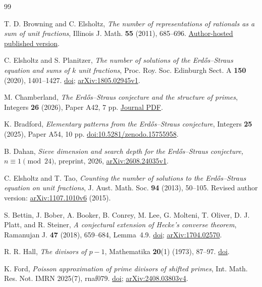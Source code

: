 \documentclass[11pt]{article}
\theoremstyle{remark}\newtheorem{remark}[theorem]{Remark}
\begin{document}
\begin{thebibliography}{99}
\small
\raggedright
{}
T. D. Browning and C. Elsholtz,
\emph{The number of representations of rationals as a sum of unit fractions},
Illinois J. Math. \textbf{55} (2011), 685--696.
\href{https://www.math.tugraz.at/~elsholtz/WWW/papers/papers33FINAL2013.pdf}{Author-hosted published version}.

C. Elsholtz and S. Planitzer,
\emph{The number of solutions of the Erd\H{o}s--Straus equation and sums
of $k$ unit fractions}, Proc. Roy. Soc. Edinburgh Sect. A
\textbf{150} (2020), 1401--1427.
\href{https://doi.org/10.1017/prm.2018.137}{doi};
\href{https://arxiv.org/abs/1805.02945v1}{arXiv:1805.02945v1}.

M. Chamberland,
\emph{The Erd\H{o}s--Straus conjecture and the structure of primes},
Integers \textbf{26} (2026), Paper A42, 7 pp.
\href{https://math.colgate.edu/~integers/aa42/aa42.pdf}{Journal PDF}.

K. Bradford,
\emph{Elementary patterns from the Erd\H{o}s--Straus conjecture},
Integers \textbf{25} (2025), Paper A54, 10 pp.
\href{https://doi.org/10.5281/zenodo.15755958}{doi:10.5281/zenodo.15755958}.

B. Dahan,
\emph{Sieve dimension and search depth for the Erd\H{o}s--Straus conjecture,
$n\equiv1\pmod{24}$}, preprint, 2026,
\href{https://arxiv.org/abs/2608.24035v1}{arXiv:2608.24035v1}.

C. Elsholtz and T. Tao,
\emph{Counting the number of solutions to the Erd\H{o}s--Straus equation
on unit fractions}, J. Aust. Math. Soc. \textbf{94} (2013), 50--105.
Revised author version:
\href{https://arxiv.org/abs/1107.1010v6}{arXiv:1107.1010v6} (2015).

S. Bettin, J. Bober, A. Booker, B. Conrey, M. Lee, G. Molteni,
T. Oliver, D. J. Platt, and R. Steiner,
\emph{A conjectural extension of Hecke's converse theorem},
Ramanujan J. \textbf{47} (2018), 659--684, Lemma~4.9.
\href{https://doi.org/10.1007/s11139-017-9953-y}{doi};
\href{https://arxiv.org/abs/1704.02570}{arXiv:1704.02570}.

R. R. Hall, \emph{The divisors of $p-1$},
Mathematika \textbf{20}(1) (1973), 87--97.
\href{https://doi.org/10.1112/S0025579300003661}{doi}.

K. Ford,
\emph{Poisson approximation of prime divisors of shifted primes},
Int. Math. Res. Not. IMRN 2025(7), rnaf079.
\href{https://doi.org/10.1093/imrn/rnaf079}{doi};
\href{https://arxiv.org/abs/2408.03803v4}{arXiv:2408.03803v4}.


\end{thebibliography}
\end{document}
